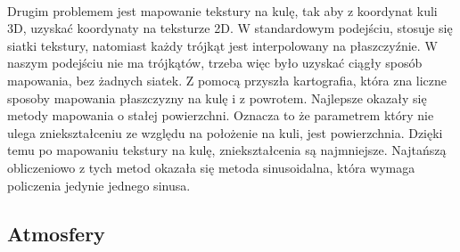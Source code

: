 \paragraph{}

Drugim problemem jest mapowanie tekstury na kulę, tak aby z koordynat kuli 3D, uzyskać koordynaty na teksturze 2D. W standardowym podejściu, stosuje się siatki tekstury, natomiast każdy trójkąt jest interpolowany na płaszczyźnie. W naszym podejściu nie ma trójkątów, trzeba więc było uzyskać ciągły sposób mapowania, bez żadnych siatek. Z pomocą przyszła kartografia, która zna liczne sposoby mapowania płaszczyzny na kulę i z powrotem. Najlepsze okazały się metody mapowania o stałej powierzchni. Oznacza to że parametrem który nie ulega zniekształceniu ze względu na położenie na kuli, jest powierzchnia. Dzięki temu po mapowaniu tekstury na kulę, zniekształcenia są najmniejsze. Najtańszą obliczeniowo z tych metod okazała się metoda sinusoidalna, która wymaga policzenia jedynie jednego sinusa.

\subsection{Atmosfery}\label{sub:atmosfery}
\paragraph{}

